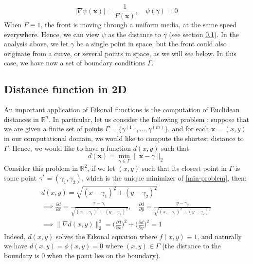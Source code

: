 \documentclass[11pt]{article}
\theoremstyle{definition}
\theoremstyle{remark}
\newcommand{\R}{\mathbb{R}}
\begin{document}
\begin{equation*}
    |\nabla\psi(\textbf{x})|=\frac{1}{F(\textbf{x})}, \quad \psi(\gamma)=0
\end{equation*}
When $F\equiv1$, the front is moving through a uniform media, at the same speed everywhere. Hence, we can view $\psi$ as the distance to $\gamma$ (see section \ref{section_on_distance}). In the analysis above, we let $\gamma$ be a single point in space, but the front could also originate from a curve, or several points in space, as we will see below. In this case, we have now a set of boundary conditions $\Gamma$.

\subsection{Distance function in 2D}
\label{section_on_distance}
An important application of Eikonal functions is the computation of Euclidean distances in $\R^n$. In particular, let us consider the following problem : suppose that we are given a  finite set of points $\Gamma = \{\gamma^{(1)},\dots,\gamma^{(m)}\}$, and for each $\textbf{x}=(x,y)$ in our computational domain, we would like to compute the shortest distance to $\Gamma$. Hence, we would like to have a function $d(x,y)$ such that
\begin{equation}
\label{min-problem}
    d(\textbf{x}) = \min_{\gamma \in \Gamma}\|\textbf{x}-\gamma\|_2
\end{equation}
Consider this problem in $\R^2$, if we let $(x,y)$ such that its closest point in $\Gamma$ is some point $\gamma^{*}=(\gamma_1,\gamma_2)$, which is the unique minimizer of \eqref{min-problem}, then:
\begin{gather*}
    d(x,y) = \sqrt{(x-\gamma_1)^2+(y-\gamma_2)^2} \\[10pt] 
    \implies\frac{\partial d}{\partial x}=\frac{x-\gamma_1}{\sqrt{(x-\gamma_1)^2+(y-\gamma_2)^2}}, \quad 
    \frac{\partial d}{\partial y}=\frac{y-\gamma_2}{\sqrt{(x-\gamma_1)^2+(y-\gamma_2)^2}} \\[10pt] 
    \implies \|\nabla d(x,y)\|^{2}_{2} = \Bigg(\frac{\partial d}{\partial x}\Bigg)^2 + \Bigg(\frac{\partial d}{\partial y}\Bigg)^2=1
\end{gather*}
Indeed, $d(x,y)$ solves the Eikonal equation where $f(x,y) \equiv 1$, and naturally we have $d(x,y)=\phi(x,y)=0$ where $(x,y)\in\Gamma$ (the distance to the boundary is 0 when the point lies on the boundary).

\vspace{5pt}
\end{document}
